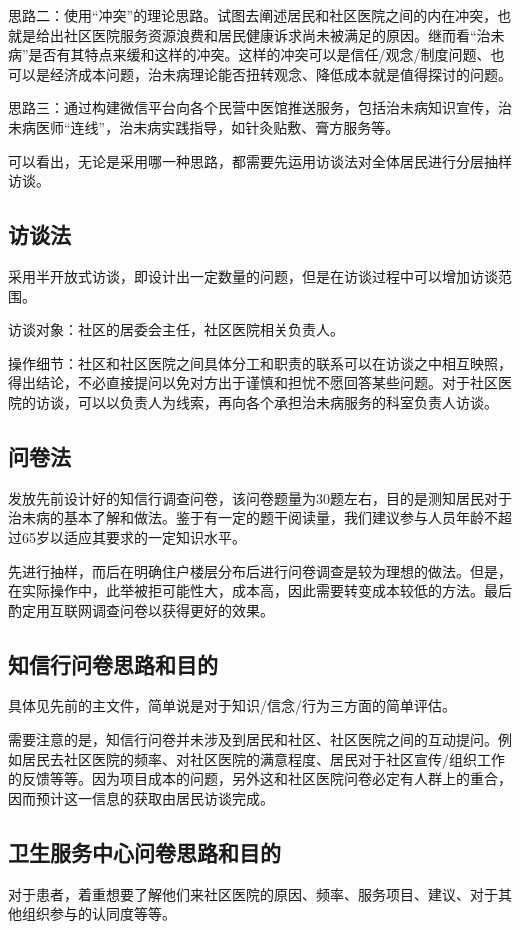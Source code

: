 \documentclass{article}
\begin{document}
   思路二：使用“冲突”的理论思路。试图去阐述居民和社区医院之间的内在冲突，也就是给出社区医院服务资源浪费和居民健康诉求尚未被满足的原因。继而看“治未病”是否有其特点来缓和这样的冲突。这样的冲突可以是信任/观念/制度问题、也可以是经济成本问题，治未病理论能否扭转观念、降低成本就是值得探讨的问题。
   
   思路三：通过构建微信平台向各个民营中医馆推送服务，包括治未病知识宣传，治未病医师“连线”，治未病实践指导，如针灸贴敷、膏方服务等。
    
    可以看出，无论是采用哪一种思路，都需要先运用访谈法对全体居民进行分层抽样访谈。
    \subsection{访谈法}
    采用半开放式访谈，即设计出一定数量的问题，但是在访谈过程中可以增加访谈范围。
    
    访谈对象：社区的居委会主任，社区医院相关负责人。
    
    操作细节：社区和社区医院之间具体分工和职责的联系可以在访谈之中相互映照，得出结论，不必直接提问以免对方出于谨慎和担忧不愿回答某些问题。对于社区医院的访谈，可以以负责人为线索，再向各个承担治未病服务的科室负责人访谈。
    \subsection{问卷法}
    发放先前设计好的知信行调查问卷，该问卷题量为30题左右，目的是测知居民对于治未病的基本了解和做法。鉴于有一定的题干阅读量，我们建议参与人员年龄不超过65岁以适应其要求的一定知识水平。
    
   先进行抽样，而后在明确住户楼层分布后进行问卷调查是较为理想的做法。但是，在实际操作中，此举被拒可能性大，成本高，因此需要转变成本较低的方法。最后酌定用互联网调查问卷以获得更好的效果。
    
    \subsection{知信行问卷思路和目的}
    具体见先前的主文件，简单说是对于知识/信念/行为三方面的简单评估。
    
    需要注意的是，知信行问卷并未涉及到居民和社区、社区医院之间的互动提问。例如居民去社区医院的频率、对社区医院的满意程度、居民对于社区宣传/组织工作的反馈等等。因为项目成本的问题，另外这和社区医院问卷必定有人群上的重合，因而预计这一信息的获取由居民访谈完成。
        \subsection{卫生服务中心问卷思路和目的}
        对于患者，着重想要了解他们来社区医院的原因、频率、服务项目、建议、对于其他组织参与的认同度等等。
        
\end{document}
